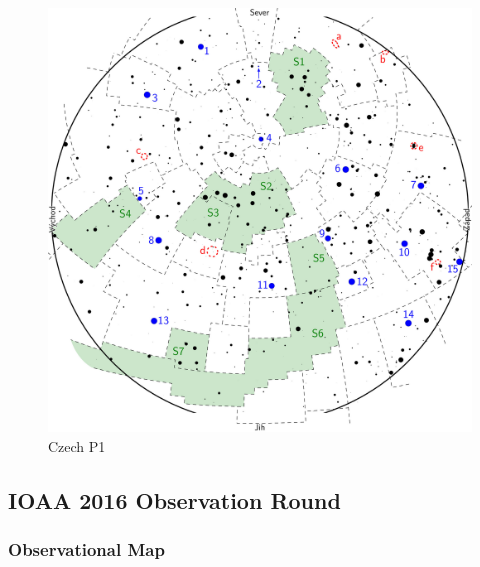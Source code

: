 \documentclass[a4paper,12pt]{extarticle}
\begin{document}
\begin{figure}[H]
	\centering
	\includegraphics[width=1\linewidth]{Cz1.png}
	\caption{Czech P1}
	\label{cz1}
\end{figure}


\subsection{IOAA 2016 Observation Round}

\subsubsection{Observational Map}
\end{document}

